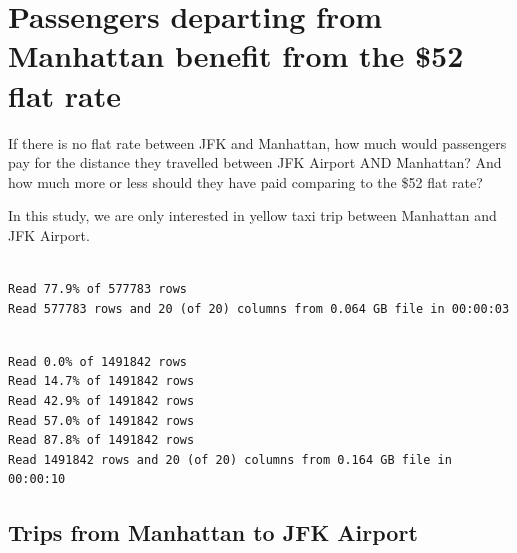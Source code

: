 \documentclass[12pt,twoside]{reedthesis}
\newenvironment{Shaded}{\begin{snugshade}}{\end{snugshade}}
\newcommand{\KeywordTok}[1]{\textcolor[rgb]{0.13,0.29,0.53}{\textbf{#1}}}
\newcommand{\DataTypeTok}[1]{\textcolor[rgb]{0.13,0.29,0.53}{#1}}
\newcommand{\DecValTok}[1]{\textcolor[rgb]{0.00,0.00,0.81}{#1}}
\newcommand{\StringTok}[1]{\textcolor[rgb]{0.31,0.60,0.02}{#1}}
\newcommand{\OtherTok}[1]{\textcolor[rgb]{0.56,0.35,0.01}{#1}}
\newcommand{\OperatorTok}[1]{\textcolor[rgb]{0.81,0.36,0.00}{\textbf{#1}}}
\newcommand{\NormalTok}[1]{#1}
\theoremstyle{definition}
\theoremstyle{definition}
\theoremstyle{definition}
\theoremstyle{remark}
\begin{document}
\section{Passengers departing from Manhattan benefit from the \$52 flat
rate}\label{passengers-departing-from-manhattan-benefit-from-the-52-flat-rate}

If there is no flat rate between JFK and Manhattan, how much would
passengers pay for the distance they travelled between JFK Airport AND
Manhattan? And how much more or less should they have paid comparing to
the \$52 flat rate?

In this study, we are only interested in yellow taxi trip between
Manhattan and JFK Airport.
\begin{Shaded}
\end{Shaded}
\begin{verbatim}

Read 77.9% of 577783 rows
Read 577783 rows and 20 (of 20) columns from 0.064 GB file in 00:00:03
\end{verbatim}
\begin{verbatim}

Read 0.0% of 1491842 rows
Read 14.7% of 1491842 rows
Read 42.9% of 1491842 rows
Read 57.0% of 1491842 rows
Read 87.8% of 1491842 rows
Read 1491842 rows and 20 (of 20) columns from 0.164 GB file in 00:00:10
\end{verbatim}
\subsection{Trips from Manhattan to JFK
Airport}\label{trips-from-manhattan-to-jfk-airport}
\end{document}
